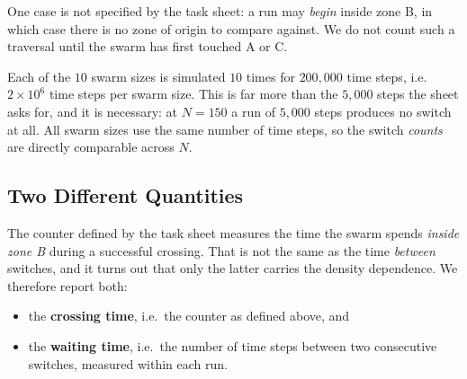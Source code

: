 \documentclass[12pt, a4paper]{article}
\begin{document}
One case is not specified by the task sheet: a run may \emph{begin} inside zone
B, in which case there is no zone of origin to compare against.  We do not count
such a traversal until the swarm has first touched A or C.

Each of the $10$ swarm sizes is simulated $10$ times for $200{,}000$ time steps,
i.e.\ $2 \times 10^6$ time steps per swarm size.  This is far more than the
$5{,}000$ steps the sheet asks for, and it is necessary: at $N = 150$ a run of
$5{,}000$ steps produces no switch at all.  All swarm sizes use the same number
of time steps, so the switch \emph{counts} are directly comparable across $N$.

\subsection{Two Different Quantities}

The counter defined by the task sheet measures the time the swarm spends
\emph{inside zone B} during a successful crossing.  That is not the same as the
time \emph{between} switches, and it turns out that only the latter carries the
density dependence.  We therefore report both:

\begin{itemize}
    \item the \textbf{crossing time}, i.e.\ the counter as defined above, and
    \item the \textbf{waiting time}, i.e.\ the number of time steps between two
          consecutive switches, measured within each run.
\end{itemize}
\end{document}
